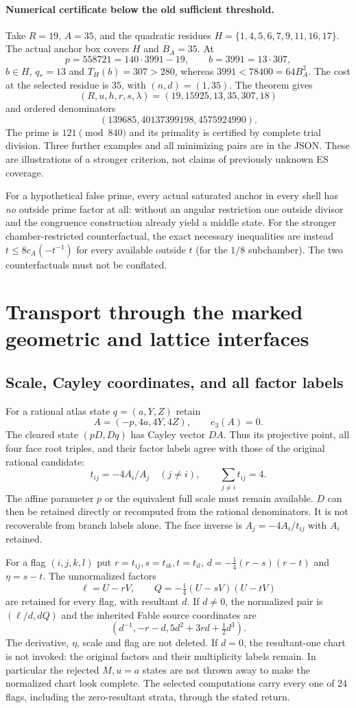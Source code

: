 \documentclass[11pt]{article}
\theoremstyle{definition}\newtheorem{definition}[theorem]{Definition}
\theoremstyle{remark}\newtheorem{remark}[theorem]{Remark}
\begin{document}
\paragraph{Numerical certificate below the old sufficient threshold.}
Take $R=19$, $A=35$, and the quadratic residues
$H=\{1,4,5,6,7,9,11,16,17\}$. The actual anchor box covers $H$ and
$B_A=35$. At
\[
 p=558721=140\cdot3991-19,\qquad b=3991=13\cdot307,
\]
$b\in H$, $q_*=13$ and $T_H(b)=307>280$,
whereas $3991<78400=64B_A^2$. The cost at the selected residue is $35$,
with $(n,d)=(1,35)$. The theorem gives
\[
 (R,u,h,r,s,\lambda)=(19,15925,13,35,307,18)
\]
and ordered denominators
\[
 (139685,40137399198,4575924990).
\]
The prime is $121\pmod{840}$ and its primality is certified by complete trial
division. Three further examples and all minimizing pairs are in the JSON.
These are illustrations of a stronger criterion, not claims of previously
unknown ES coverage.

For a hypothetical false prime, every actual saturated anchor in every
shell has \emph{no} outside prime factor at all: without an angular restriction
one outside divisor and the congruence construction already yield a middle
state. For the stronger chamber-restricted counterfactual, the exact
necessary inequalities are instead
$t\le8c_A(-t^{-1})$ for every available outside $t$ (for the $1/8$
subchamber). The two counterfactuals must not be conflated.

\section{Transport through the marked geometric and lattice interfaces}
\subsection{Scale, Cayley coordinates, and all factor labels}
For a rational atlas state $q=(a,Y,Z)$ retain
\[
 A=(-p,4a,4Y,4Z),\qquad e_3(A)=0.
\]
The cleared state $(pD,Dq)$ has Cayley vector $DA$. Thus its projective
point, all four face root triples, and their factor labels agree with those
of the original rational candidate:
\[
 t_{ij}=-4A_i/A_j\quad(j\ne i),\qquad \sum_{j\ne i}t_{ij}=4.
\]
The affine parameter $p$ or the equivalent full scale must remain available.
$D$ can then be retained directly or recomputed from the rational denominators.
It is not recoverable from branch labels alone.
The face inverse is $A_j=-4A_i/t_{ij}$ with $A_i$ retained.

For a flag $(i,j,k,l)$ put $r=t_{ij},s=t_{ik},t=t_{il}$,
$d=-\tfrac14(r-s)(r-t)$ and $\eta=s-t$. The unnormalized factors
\[
 \ell=U-rV,\qquad Q=-\tfrac14(U-sV)(U-tV)
\]
are retained for every flag, with resultant $d$.
If $d\ne0$, the normalized pair is $(\ell/d,dQ)$ and the inherited Fable
source coordinates are
\[
 (d^{-1},-r-d,5d^2+3rd+\tfrac12d^3).
\]
The derivative, $\eta$, scale and flag are not deleted. If $d=0$,
the resultant-one chart is not invoked: the original factors and their
multiplicity labels remain. In particular the rejected $M,u=a$ states
are not thrown away to make the normalized chart look complete.
The selected computations carry every one of 24 flags, including the
zero-resultant strata, through the stated return.
\end{document}
